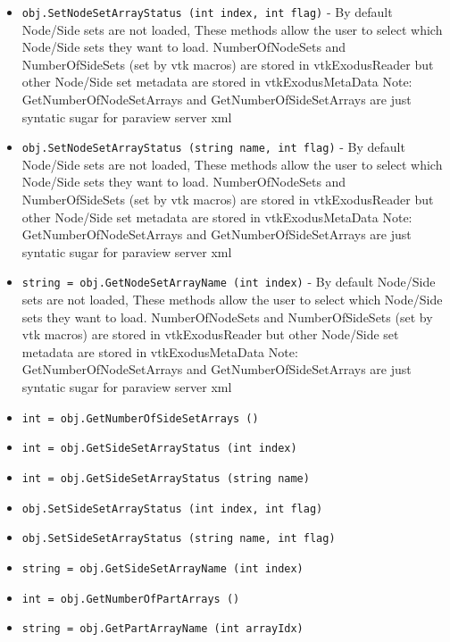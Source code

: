 \begin{itemize}
\item  \verb|obj.SetNodeSetArrayStatus (int index, int flag)| -  By default Node/Side sets are not loaded, These methods allow the user to
 select which Node/Side sets they want to load. NumberOfNodeSets and
 NumberOfSideSets (set by vtk macros) are stored in vtkExodusReader 
 but other Node/Side set metadata are stored in vtkExodusMetaData
 Note: GetNumberOfNodeSetArrays and GetNumberOfSideSetArrays are
 just syntatic sugar for paraview server xml

\item  \verb|obj.SetNodeSetArrayStatus (string name, int flag)| -  By default Node/Side sets are not loaded, These methods allow the user to
 select which Node/Side sets they want to load. NumberOfNodeSets and
 NumberOfSideSets (set by vtk macros) are stored in vtkExodusReader 
 but other Node/Side set metadata are stored in vtkExodusMetaData
 Note: GetNumberOfNodeSetArrays and GetNumberOfSideSetArrays are
 just syntatic sugar for paraview server xml

\item  \verb|string = obj.GetNodeSetArrayName (int index)| -  By default Node/Side sets are not loaded, These methods allow the user to
 select which Node/Side sets they want to load. NumberOfNodeSets and
 NumberOfSideSets (set by vtk macros) are stored in vtkExodusReader 
 but other Node/Side set metadata are stored in vtkExodusMetaData
 Note: GetNumberOfNodeSetArrays and GetNumberOfSideSetArrays are
 just syntatic sugar for paraview server xml

\item  \verb|int = obj.GetNumberOfSideSetArrays ()|

\item  \verb|int = obj.GetSideSetArrayStatus (int index)|

\item  \verb|int = obj.GetSideSetArrayStatus (string name)|

\item  \verb|obj.SetSideSetArrayStatus (int index, int flag)|

\item  \verb|obj.SetSideSetArrayStatus (string name, int flag)|

\item  \verb|string = obj.GetSideSetArrayName (int index)|

\item  \verb|int = obj.GetNumberOfPartArrays ()|

\item  \verb|string = obj.GetPartArrayName (int arrayIdx)|


\end{itemize}
